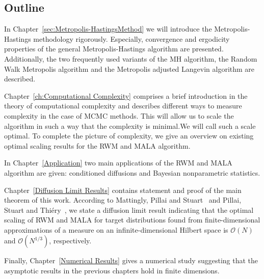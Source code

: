 \subsection*{Outline}

In Chapter~\ref{sec:Metropolis-HastingsMethod} we will introduce the Metropolis-Hastings methodology rigorously. Especially, convergence and ergodicity properties of the general Metropolis-Hastings algorithm are presented. Additionally, the two frequently used variants of the MH algorithm, the Random Walk Metropolis algorithm and the Metropolis adjusted Langevin algorithm are described.

Chapter~\ref{ch:Computational Complexity} comprises a brief introduction in the theory of computational complexity and describes different ways to measure complexity in the case of MCMC methods. This will  allow us to scale the algorithm in such a way that the complexity is minimal.We will call such a scale optimal. To complete the picture of complexity, we give an overview on existing optimal scaling results for the RWM and MALA algorithm. 

In Chapter~\ref{Application} two main applications of the RWM and MALA algorithm are given: conditioned diffusions and Bayesian nonparametric statistics. 

Chapter~\ref{Diffusion Limit Results} contains statement and proof of the main theorem of this work. According to Mattingly, Pillai and Stuart~\autocite{Mattingly2010} and Pillai, Stuart and Thi\'{e}ry~\autocite{Pillai2012}, we state a diffusion limit result indicating that the optimal scaling of RWM and MALA  for target distributions found from finite-dimensional approximations of a measure on an infinite-dimensional Hilbert space is $\mathcal{O}(N)$ and $\mathcal{O}(N^{1/3})$, respectively. 

Finally, Chapter~\ref{Numerical Results} gives a numerical study suggesting that the asymptotic results in the previous chapters hold in finite dimensions.






